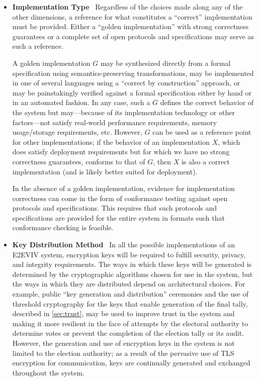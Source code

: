 \begin{itemize}
\item \textbf{Implementation Type} \ Regardless of the choices made
  along any of the other dimensions, a reference for what constitutes
  a ``correct'' implementation must be provided. Either a ``golden
  im\-ple\-men\-ta\-tion'' with strong correctness guarantees or a
  complete set of open protocols and specifications may serve as such
  a reference.

  A golden implementation $G$ may be synthesized directly from a
  formal specification using semantics-preserving transformations, may
  be implemented in one of several languages using a ``correct by
  construction'' approach, or may be painstakingly verified against a
  formal specification either by hand or in an automated fashion. In
  any case, such a $G$ defines the correct behavior of the system but
  may---because of its implementation technology or other
  factors---not satisfy real-world performance requirements, memory
  usage/storage requirements, etc.  However, $G$ can be used as a
  reference point for other implementations; if the behavior of an
  implementation $X$, which does satisfy deployment requirements but
  for which we have no strong correctness guarantees, conforms to that
  of $G$, then $X$ is also a correct implementation (and is likely
  better suited for deployment).

  In the absence of a golden implementation, evidence for
  implementation correctness can come in the form of conformance
  testing against open protocols and specifications. This requires
  that such protocols and specifications are provided for the entire
  system in formats such that conformance checking is feasible.

\item \textbf{Key Distribution Method} \ In all the possible
  implementations of an E2EVIV system, encryption keys will be
  required to fulfill security, privacy, and integrity
  requirements. The ways in which these keys will be generated is determined by the
  cryptographic algorithms chosen for use in the system, but the ways
  in which they are distributed depend on architectural choices. For
  example, public ``key generation and distribution'' ceremonies and
  the use of threshold cryptography for the keys that enable
  generation of the final tally, described in \autoref{sec:trust}, may
  be used to improve trust in the system and making it more resilient
  in the face of attempts by the electoral
  authority to determine votes or prevent the completion of the election tally or its audit. However, the generation and use of encryption keys in the
  system is not limited to the election authority; as a result of the
  pervasive use of TLS encryption for communication, keys are
  continually generated and exchanged throughout the system. 


\end{itemize}

